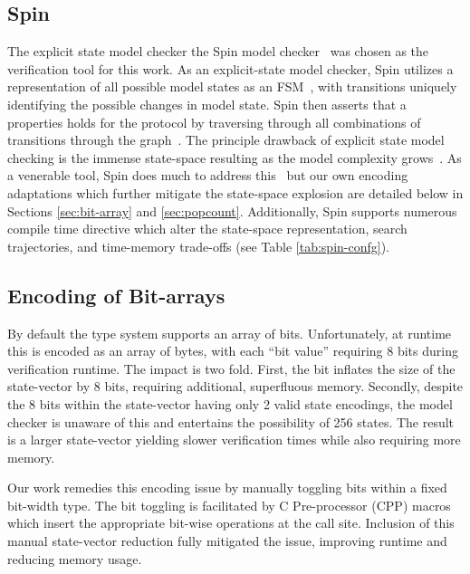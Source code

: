 \documentclass[runningheads]{llncs}
\newcommand{\Abrev}[1]{\gls{#1}}
\begin{document}
\subsection{Spin}

The explicit state model checker the Spin model checker~\cite{HolzmannSpinBook2003} was chosen as the verification tool for this work.
As an explicit-state model checker, Spin utilizes a representation of all possible model states as an \Abrev{FSM}~\cite{clarke1981design}, with transitions uniquely identifying the possible changes in model state.
Spin then asserts that a properties holds for the protocol by traversing through all combinations of transitions through the graph~\cite{Vardi1986}.
The principle drawback of explicit state model checking is the immense state-space resulting as the model complexity grows~\cite{burch1992symbolic}.
As a venerable tool, Spin does much to address this~\cite{rudin1987limits, godefroid1990using, valmari1993fly, peled1994combining, couvreur1999fly} but our own encoding adaptations which further mitigate the state-space explosion are detailed below in Sections \ref{sec:bit-array} and \ref{sec:popcount}.
Additionally, Spin supports numerous compile time directive which alter the state-space representation, search trajectories, and time-memory trade-offs (see Table \ref{tab:spin-confg}).


\subsection{Encoding  of Bit-arrays\label{sec:bit-array}}

By default the \Promela type system supports an array of bits.
Unfortunately, at runtime this is encoded as an array of bytes, with each ``\Promela bit value'' requiring 8 bits during verification runtime.
The impact is two fold.
First, the bit inflates the size of the state-vector by 8 bits, requiring additional, superfluous memory.
Secondly, despite the 8 bits within the state-vector having only 2 valid state encodings, the model checker is unaware of this and entertains the possibility of 256 states.
The result is a larger state-vector yielding slower verification times while also requiring more memory.

Our work remedies this encoding issue by manually toggling bits within a fixed bit-width \Promela type.
The bit toggling is facilitated by C Pre-processor (CPP) macros which insert the appropriate bit-wise operations at the call site.
Inclusion of this manual state-vector reduction fully mitigated the issue, improving runtime and reducing memory usage.
\end{document}
